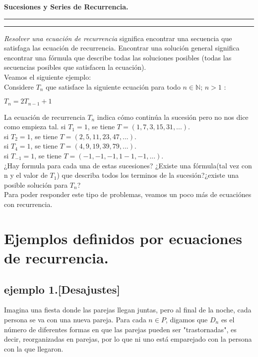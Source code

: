 \documentclass{article}
\begin{document}
\begin{minipage}[c]{10cm}
\end{minipage}
\begin{center}
\textbf{Sucesiones y Series de Recurrencia.}
\end{center}
\vspace*{-0.1cm}
\hrule
\vspace*{0.1cm}
\rule{17cm}{1mm}
\vspace{0.2cm}

\textit{Resolver una ecuación de recurrencia} significa encontrar una secuencia que satisfaga las ecuación de recurrencia. Encontrar una solución general significa encontrar una fórmula que describe todas las soluciones posibles (todas las secuencias posibles que satisfacen la ecuación).\\
Veamos el siguiente ejemplo:\\
Considere $T_{n}$ que satisface la siguiente ecuación para todo $n \in \mathbb{N}$; $n>1$ :
\begin{center}
$T_{n} = 2T_{n-1} + 1 $ 
\end{center}

La ecuación de recurrencia $T_{n}$ indica cómo continúa la sucesión pero no nos dice como empieza tal.
\newline
si $T_{1} = 1$,\hspace*{1cm} se tiene $T = (1,7,3,15,31,...)$.\\
si $T_{2} = 1$,\hspace*{1cm} se tiene $T = (2,5,11,23,47,...)$.\\
si $T_{4} = 1$,\hspace*{1cm} se tiene $T = (4,9,19,39,79,...)$.\\
si $T_{-1}= 1$,\hspace*{1cm} se tiene $T = (-1,-1,-1,1-1,-1,...)$.\\

¿Hay formula para cada una de estas sucesiones? ¿Existe una fórmula(tal vez con n y el valor de $T_{1}$) que describa todos los terminos de la sucesión?¿existe una posible solución para $T_{n}$?\\Para poder responder este tipo de problemas, veamos un poco más de ecuaciónes con recurrencia.

\section{Ejemplos definidos por ecuaciones de recurrencia.}
\subsection{ejemplo 1.[Desajustes]}
Imagina una fiesta donde las parejas llegan juntas, pero al final de la noche, cada persona se va con una nueva pareja. Para cada $n \in P$, digamos que $D_{n}$ es el número de diferentes formas en que las parejas pueden ser "trastornadas", es decir, reorganizadas en parejas, por lo que ni uno está emparejado con la persona con la que llegaron.\\
\end{document}
